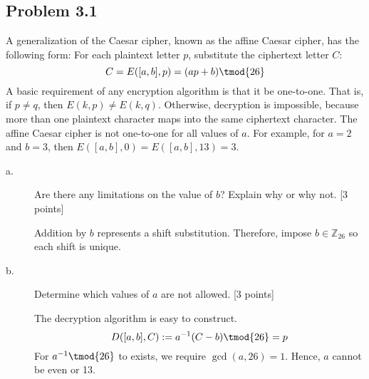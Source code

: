 \documentclass[../hw_sols.tex]{subfiles}
\begin{document}

\subsection*{Problem 3.1}

A generalization of the Caesar cipher, known as the affine Caesar cipher, has 
the following form: For each plaintext letter $p$, substitute the ciphertext 
letter $C$:
	$$C = E([a,b], p) = (ap + b) \tmod{26}$$
A basic requirement of any encryption algorithm is that it be one-to-one. 
That is, if $p \neq q$, then $E(k,p) \neq E(k,q)$. Otherwise, decryption is 
impossible, because more than one plaintext character maps into the same 
ciphertext character. The affine Caesar cipher is not one-to-one for all 
values of $a$. For example, for $a = 2$ and $b = 3$, then \newline
$E([a,b], 0) = E([a,b], 13) = 3$.

\begin{description}

\item[a.] Are there any limitations on the value of $b$? Explain why or why 
not. [3 points]

\begin{solution}
Addition by $b$ represents a shift substitution. Therefore, impose 
$b \in \mathbb{Z}_{26}$ so each shift is unique.
\end{solution}

\item[b.] Determine which values of $a$ are not allowed. [3 points]

\begin{solution}
The decryption algorithm is easy to construct.
	$$D([a,b],C) := a^{-1}(C-b) \tmod{26} = p$$
For $a^{-1} \tmod{26}$ to exists, we require $\gcd(a,26) = 1$. Hence, $a$ 
cannot be even or 13.
\end{solution}

\end{description}


\newpage


\end{document}
